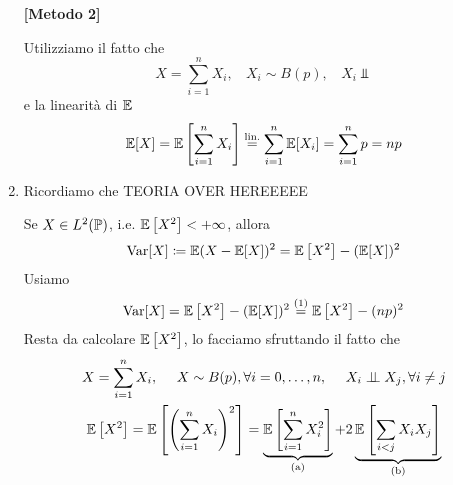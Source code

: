 \begin{enumerate}
\textbf{[Metodo 2]}

Utilizziamo il fatto che
\begin{equation*}
X=\sum\limits _{i=1}^{n} X_{i} ,\ \ \ \ X_{i} \sim B( p) ,\ \ \ \ X_{i} \Bot 
\end{equation*}
e la linearità di $\mathbb{E}$
\begin{equation*}
\mathbb{E}[ X] =\mathbb{E}\left[\sum\limits _{i=1}^{n} X_{i}\right]\overset{\text{lin.}}{=}\sum\limits _{i=1}^{n}\mathbb{E}[ X_{i}] =\sum\limits _{i=1}^{n} p=np
\end{equation*}
\item Ricordiamo che TEORIA OVER HEREEEEE

Se $X\in L^{2}(\mathbb{P})$, i.e. $\mathbb{E}\left[ X^{2}\right] < +\infty $, allora
\begin{equation*}
\mathrm{Var}[ X] \coloneqq \mathbb{E}( X-\mathbb{E}[ X])^{2} =\mathbb{E}\left[ X^{2}\right] -(\mathbb{E}[ X])^{2}
\end{equation*}
Usiamo
\begin{equation*}
\mathrm{Var}[ X] =\mathbb{E}\left[ X^{2}\right] -(\mathbb{E}[ X])^{2}\overset{( 1)}{=}\mathbb{E}\left[ X^{2}\right] -( np)^{2}
\end{equation*}
Resta da calcolare $\mathbb{E}\left[ X^{2}\right]$, lo facciamo sfruttando il fatto che
\begin{gather*}
X=\sum\limits _{i=1}^{n} X_{i} ,\ \ \ \ X\sim B( p) ,\forall i=0,\dots ,n,\ \ \ \ X_{i} \perp \!\!\! \perp X_{j} ,\forall i\neq j\\
\mathbb{E}\left[ X^{2}\right] =\mathbb{E}\left[\left(\sum\limits _{i=1}^{n} X_{i}\right)^{2}\right] =\underbrace{\mathbb{E}\left[\sum\limits _{i=1}^{n} X_{i}^{2}\right]}_{\text{(a)}} +2\underbrace{\mathbb{E}\left[\sum\limits _{i< j} X_{i} X_{j}\right]}_{\text{(b)}}
\end{gather*}


\end{enumerate}
